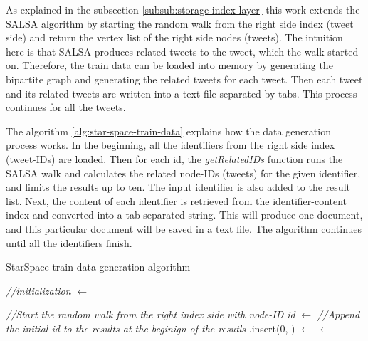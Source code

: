 As explained in the subsection \ref{subsub:storage-index-layer} this work extends the SALSA algorithm by starting the random walk from the right side index (tweet side) and return the vertex list of the right side nodes (tweets). The intuition here is that SALSA produces related tweets to the tweet, which the walk started on. Therefore, the train data can be loaded into memory by generating the bipartite graph and generating the related tweets for each tweet. Then each tweet and its related tweets are written into a text file separated by tabs. This process continues for all the tweets.


The algorithm \ref{alg:star-space-train-data} explains how the data generation process works. In the beginning, all the identifiers from the right side index (tweet-IDs) are loaded. Then for each id, the \emph{getRelatedIDs} function runs the SALSA walk and calculates the related node-IDs (tweets) for the given identifier, and limits the results up to ten. The input identifier is also added to the result list. Next, the content of each identifier is retrieved from the identifier-content index and converted into a tab-separated string. This will produce one document, and this particular document will be saved in a text file. The algorithm continues until all the identifiers finish.


\begin{algorithm}[H]
    \caption{StarSpace train data generation algorithm}
    \label{alg:star-space-train-data}




    \SetAlgoLined

    \BlankLine\emph{//initialization}\BlankLine
    \allIDs $\leftarrow$ \getAllRightIndexKeys{}\;

    \BlankLine

    {
		\emph{//Start the random walk from the right index side with node-ID id}\;
		\listRecommendations $\leftarrow$ \getRelatedIDs{\id}\;
		\BlankLine
		\emph{//Append the initial id to the results at the beginign of the resutls}\;
		\listRecommendations.insert(0, \id)\;
		\BlankLine
		\listContent $\leftarrow$ \getContentOf{\listRecommendations}\;
		\document $\leftarrow$ \;
		\;
    }

    \BlankLine
\end{algorithm}


